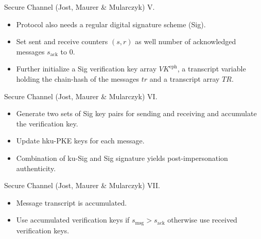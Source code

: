\documentclass{beamer}
\renewcommand{\t}{\text}
\begin{document}
\begin{frame}{Secure Channel (Jost, Maurer \& Mularczyk) V.}
  \scriptsize
  \begin{figure}[ht]
     \centering
     \setlength{\fboxsep}{10pt}
     \scalebox{0.6}{%
       \fbox{%
         
       }
     }
  \end{figure}
  \begin{itemize}
  \item Protocol also needs a regular digital signature scheme (Sig).
  \item Set sent and receive counters $(s,r)$ as well number of acknowledged
    messages $s_\t{ack}$ to 0.
  \item Further initialize a Sig verification key array $VK^\t{eph}$, a transcript
    variable holding the chain-hash of the messages $tr$ and a transcript array $TR$.
  \end{itemize}
\end{frame}

\begin{frame}{Secure Channel (Jost, Maurer \& Mularczyk) VI.}
  \scriptsize
  \begin{figure}[ht]
     \centering
     \setlength{\fboxsep}{10pt}
     \scalebox{0.6}{%
       \fbox{%
         
       }
     }
  \end{figure}
  \begin{itemize}
  \item Generate two sets of Sig key pairs for sending and receiving and
    accumulate the verification key.
  \item Update hku-PKE keys for each message.
  \item Combination of ku-Sig and Sig signature yields post-impersonation
    authenticity.
  \end{itemize}
\end{frame}

\begin{frame}{Secure Channel (Jost, Maurer \& Mularczyk) VII.}
  \scriptsize
  \begin{figure}[ht]
     \centering
     \setlength{\fboxsep}{10pt}
     \scalebox{0.55}{%
       \fbox{%
         
       }
     }
  \end{figure}
  \begin{itemize}
  \item Message transcript is accumulated.
  \item Use accumulated verification keys if $s_\t{msg} > s_\t{ack}$ otherwise
    use received verification keys.
  \end{itemize}
\end{frame}
\end{document}
